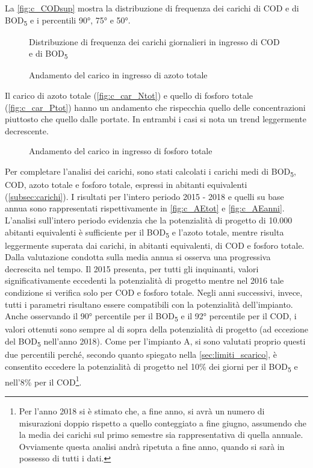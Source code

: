 La \autoref{fig:c_CODsup} mostra la distribuzione di frequenza dei carichi di COD e di BOD\textsubscript{5} e i percentili 90°, 75° e 50°.

\begin{figure}[H]
		\centering
	\caption{Distribuzione di frequenza dei carichi giornalieri in ingresso di COD e di BOD\textsubscript{5}}
	\label{fig:c_CODsup}
\end{figure}
\begin{figure}[H]
		\centering
	\caption{Andamento del carico in ingresso di azoto totale}
	\label{fig:c_car_Ntot}
\end{figure}

Il carico di azoto totale (\autoref{fig:c_car_Ntot}) e quello di fosforo totale (\autoref{fig:c_car_Ptot}) hanno un andamento che rispecchia quello delle concentrazioni piuttosto che quello dalle portate. In entrambi i casi si nota un trend leggermente decrescente.

\begin{figure}[H]
		\centering
	\caption{Andamento del carico in ingresso di fosforo totale}
	\label{fig:c_car_Ptot}
\end{figure}

Per completare l'analisi dei carichi, sono stati calcolati i carichi medi di BOD\textsubscript{5}, COD, azoto totale e fosforo totale, espressi in abitanti equivalenti (\autoref{subsec:carichi}). I risultati per l'intero periodo 2015 - 2018 e quelli su base annua sono rappresentati rispettivamente in \autoref{fig:c_AEtot} e \autoref{fig:c_AEanni}.
L'analisi sull'intero periodo evidenzia che la potenzialità di progetto di 10.000 abitanti equivalenti è sufficiente per il BOD\textsubscript{5} e l'azoto totale, mentre risulta leggermente superata dai carichi, in abitanti equivalenti, di COD e fosforo totale. Dalla valutazione condotta sulla media annua si osserva una progressiva decrescita nel tempo. Il 2015 presenta, per tutti gli inquinanti, valori significativamente eccedenti la potenzialità di progetto mentre nel 2016 tale condizione si verifica solo per COD e fosforo totale. Negli anni successivi, invece, tutti i parametri risultano essere compatibili con la potenzialità dell'impianto. Anche osservando il 90° percentile per il BOD\textsubscript{5} e il 92° percentile per il COD, i valori ottenuti sono sempre al di sopra della potenzialità di progetto (ad eccezione del BOD\textsubscript{5} nell'anno 2018). Come per l'impianto A, si sono valutati proprio questi due percentili perché, secondo quanto spiegato nella \autoref{sec:limiti_scarico}, è consentito eccedere la potenzialità di progetto nel 10\% dei giorni per il BOD\textsubscript{5} e nell'8\% per il COD\footnote{Per l'anno 2018 si è stimato che, a fine anno, si avrà un numero di misurazioni doppio rispetto a quello conteggiato a fine giugno, assumendo che la media dei carichi sul primo semestre sia rappresentativa di quella annuale. Ovviamente questa analisi andrà ripetuta a fine anno, quando si sarà in possesso di tutti i dati.}.

